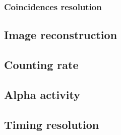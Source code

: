 \subsubsection{Coincidences resolution}

\subsection{Image reconstruction}

\subsection{Counting rate}

\subsection{Alpha activity}

\subsection{Timing resolution}
